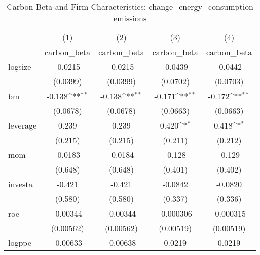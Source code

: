 \begin{table}[htbp]\centering
\def\sym#1{\ifmmode^{#1}\else\(^{#1}\)\fi}
\caption{Carbon Beta and Firm Characteristics: change\_energy\_consumption emissions}
\begin{tabular}{l*{4}{c}}
\hline\hline
                    &\multicolumn{1}{c}{(1)}&\multicolumn{1}{c}{(2)}&\multicolumn{1}{c}{(3)}&\multicolumn{1}{c}{(4)}\\
                    &\multicolumn{1}{c}{carbon\_beta}&\multicolumn{1}{c}{carbon\_beta}&\multicolumn{1}{c}{carbon\_beta}&\multicolumn{1}{c}{carbon\_beta}\\
\hline
logsize             &     -0.0215         &     -0.0215         &     -0.0439         &     -0.0442         \\
                    &    (0.0399)         &    (0.0399)         &    (0.0702)         &    (0.0703)         \\
[1em]
bm                  &      -0.138\sym{**} &      -0.138\sym{**} &      -0.171\sym{**} &      -0.172\sym{**} \\
                    &    (0.0678)         &    (0.0678)         &    (0.0663)         &    (0.0663)         \\
[1em]
leverage            &       0.239         &       0.239         &       0.420\sym{*}  &       0.418\sym{*}  \\
                    &     (0.215)         &     (0.215)         &     (0.211)         &     (0.212)         \\
[1em]
mom                 &     -0.0183         &     -0.0184         &      -0.128         &      -0.129         \\
                    &     (0.648)         &     (0.648)         &     (0.401)         &     (0.402)         \\
[1em]
investa             &      -0.421         &      -0.421         &     -0.0842         &     -0.0820         \\
                    &     (0.580)         &     (0.580)         &     (0.337)         &     (0.336)         \\
[1em]
roe                 &    -0.00344         &    -0.00344         &   -0.000306         &   -0.000315         \\
                    &   (0.00562)         &   (0.00562)         &   (0.00519)         &   (0.00519)         \\
[1em]
logppe              &    -0.00633         &    -0.00638         &      0.0219         &      0.0219         \\

\end{tabular}
\end{table}
